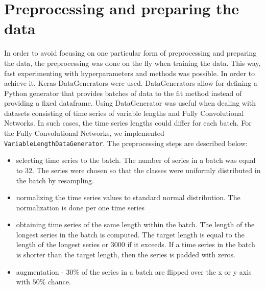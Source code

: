 \documentclass[a4paper,11pt,twoside]{report}
\theoremstyle{definition}
\begin{document}
\section{Preprocessing and preparing the data}\label{section:preprocessing}
 In order to avoid focusing on one particular form of preprocessing and preparing the data, the preprocessing was done on the fly when training the data. This way, fast experimenting with hyperparameters and methods was possible. In order to achieve it, Keras DataGenerators were used. DataGenerators allow for defining a Python generator that provides batches of data to the fit method instead of providing a fixed dataframe. Using DataGenerator was useful when dealing with datasets consisting of time series of variable lengths and Fully Convolutional Networks. In such cases, the time series lengths could differ for each batch.
For the Fully Convolutional Networks, we implemented \texttt{VariableLengthDataGenerator}.
The preprocessing steps are described below:
\begin{itemize}
   \item selecting time series to the batch. The number of series in a batch was equal to $32$. The series were chosen so that the classes were uniformly distributed in the batch by resampling.
   \item normalizing the time series values to standard normal distribution. The normalization is done per one time series
   \item obtaining time series of the same length within the batch. The length of the longest series in the batch is computed. The target length is equal to the length of the longest series or $3000$ if it exceeds. If a time series in the batch is shorter than the target length, then the series is padded with zeros.

\item augmentation - $30\%$ of the series in a batch are flipped over the x or y axis with $50\%$ chance.

\end{itemize}
\end{document}
